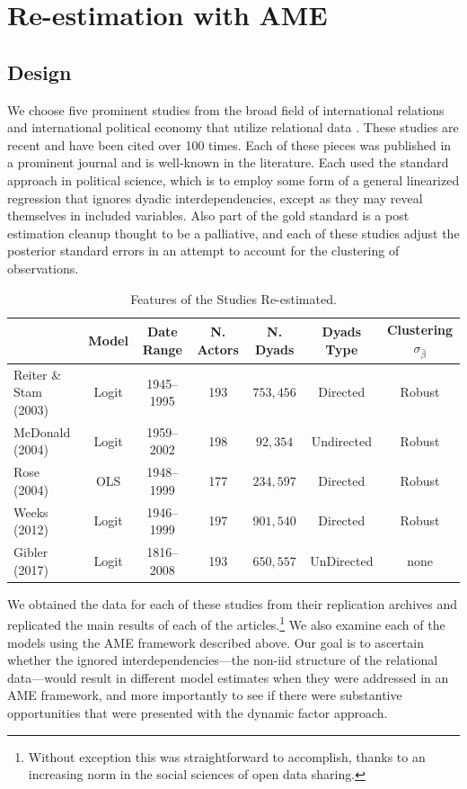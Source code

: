 \section{Re-estimation with AME}
 
\subsection{Design}

We choose five prominent studies from the broad field of international relations and international political economy that utilize relational data \citep{reiter:stam:2003, mcdonald:2004,  rose:2004, weeks:2012, gibler:2017}. These studies are recent and have been cited over 100 times. Each of these pieces was published in a prominent journal and is well-known in the literature. Each used the standard approach in political science, which is to employ some form of a general linearized regression that ignores dyadic interdependencies, except as they may reveal themselves in included variables. Also part of the gold standard is a post estimation cleanup thought to be a palliative, and each of these studies adjust the posterior standard errors in an attempt to account for the clustering of observations.

\begin{table}
\caption{Features of the Studies Re-estimated. }
	\begin{tabular}{lcccccc}
& Model &  Date Range & N. Actors  & N. Dyads & Dyads Type & Clustering $\sigma_{\hat{\beta}}$ \\ \toprule
Reiter \& Stam (2003) &Logit &1945--1995 &  193 & $753,456$ & Directed & Robust \\	
McDonald (2004) & Logit &1959--2002 & 198 & $92,354$ & Undirected & Robust\\
Rose (2004) & OLS & 1948--1999 & 177 & $234,597$ & Directed & Robust \\	 
Weeks (2012) & Logit & 1946--1999 &197 &  $901,540$ & Directed & Robust \\
Gibler (2017) & Logit & 1816--2008 &193 &   $650,557$ & UnDirected & none \\ \bottomrule
	\end{tabular}
\end{table}

We obtained the data for each of these studies from their replication archives and replicated the main results of each of the articles.\footnote{Without exception this was straightforward to accomplish, thanks to an increasing norm in the social sciences of open data sharing.} We also examine each of the models using the AME framework described above.  Our goal is to ascertain whether the ignored interdependencies---the non-iid structure of the relational data---would result in different model estimates when they were addressed in an AME framework, and more importantly to see if there were substantive opportunities that were presented with the dynamic factor approach.  

